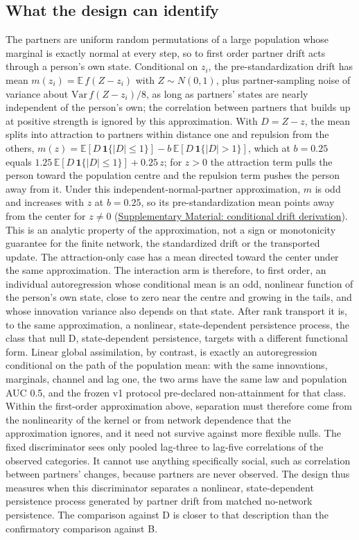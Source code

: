 \subsection{What the design can identify}

The partners are uniform random permutations of a large population whose marginal is exactly normal at every step, so to first order partner drift acts through a person's own state. %
Conditional on $z_i$, the pre-standardization drift has mean $m(z_i)=\mathbb E\,f(Z-z_i)$ with $Z\sim N(0,1)$, plus partner-sampling noise of variance about $\mathrm{Var}\,f(Z-z_i)/8$, as long as partners' states are nearly independent of the person's own; the correlation between partners that builds up at positive strength is ignored by this approximation. %
With $D=Z-z$, the mean splits into attraction to partners within distance one and repulsion from the others, $m(z)=\mathbb E[D\,\mathbf 1\{|D|\le1\}]-b\,\mathbb E[D\,\mathbf 1\{|D|>1\}]$, which at $b=0.25$ equals $1.25\,\mathbb E[D\,\mathbf 1\{|D|\le1\}]+0.25\,z$; for $z>0$ the attraction term pulls the person toward the population centre and the repulsion term pushes the person away from it. %
Under this independent-normal-partner approximation, $m$ is odd and increases with $z$ at $b=0.25$, so its pre-standardization mean points away from the center for $z\neq0$ (\hyperref[supp:drift-mean]{Supplementary Material: conditional drift derivation}). This is an analytic property of the approximation, not a sign or monotonicity guarantee for the finite network, the standardized drift or the transported update. The attraction-only case has a mean directed toward the center under the same approximation. %
The interaction arm is therefore, to first order, an individual autoregression whose conditional mean is an odd, nonlinear function of the person's own state, close to zero near the centre and growing in the tails, and whose innovation variance also depends on that state. After rank transport it is, to the same approximation, a nonlinear, state-dependent persistence process, the class that null D, state-dependent persistence, targets with a different functional form. %
Linear global assimilation, by contrast, is exactly an autoregression conditional on the path of the population mean: with the same innovations, marginals, channel and lag one, the two arms have the same law and population AUC 0.5, and the frozen v1 protocol pre-declared non-attainment for that class. %
Within the first-order approximation above, separation must therefore come from the nonlinearity of the kernel or from network dependence that the approximation ignores, and it need not survive against more flexible nulls. %
The fixed discriminator sees only pooled lag-three to lag-five correlations of the observed categories. %
It cannot use anything specifically social, such as correlation between partners' changes, because partners are never observed. %
The design thus measures when this discriminator separates a nonlinear, state-dependent persistence process generated by partner drift from matched no-network persistence. The comparison against D is closer to that description than the confirmatory comparison against B. %

